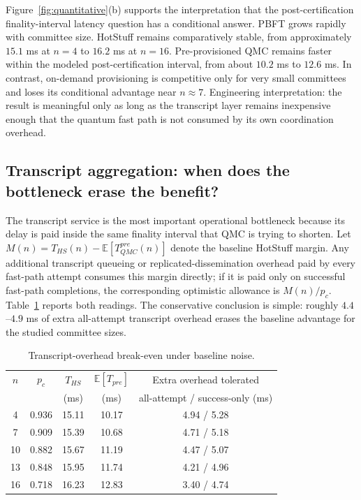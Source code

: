 \documentclass{ieeeaccess}
\begin{document}
Figure~\ref{fig:quantitative}(b) supports the interpretation that the post-certification finality-interval latency question has a conditional answer. PBFT grows rapidly with committee size. HotStuff remains comparatively stable, from approximately $15.1$ ms at $n=4$ to $16.2$ ms at $n=16$. Pre-provisioned QMC remains faster within the modeled post-certification interval, from about $10.2$ ms to $12.6$ ms. In contrast, on-demand provisioning is competitive only for very small committees and loses its conditional advantage near $n\approx 7$. Engineering interpretation: the result is meaningful only as long as the transcript layer remains inexpensive enough that the quantum fast path is not consumed by its own coordination overhead.

\subsection{Transcript aggregation: when does the bottleneck erase the benefit?}
The transcript service is the most important operational bottleneck because its delay is paid inside the same finality interval that QMC is trying to shorten. Let $M(n)=T_{HS}(n)-\mathbb{E}[T_{QMC}^{pre}(n)]$ denote the baseline HotStuff margin. Any additional transcript queueing or replicated-dissemination overhead paid by every fast-path attempt consumes this margin directly; if it is paid only on successful fast-path completions, the corresponding optimistic allowance is $M(n)/p_c$. Table~\ref{tab:aggmargin} reports both readings. The conservative conclusion is simple: roughly $4.4$--$4.9$ ms of extra all-attempt transcript overhead erases the baseline advantage for the studied committee sizes.

\begin{table}[!t]
\caption{Transcript-overhead break-even under baseline noise.}
\label{tab:aggmargin}
\centering
\scriptsize
\setlength{\tabcolsep}{2.4pt}
\renewcommand{\arraystretch}{1.12}
\begin{tabular}{ccccc}
\toprule
$n$ & $p_c$ & $T_{HS}$ & $\mathbb{E}[T_{pre}]$ & Extra overhead tolerated \\
 & & (ms) & (ms) & all-attempt / success-only (ms) \\
\midrule
4  & 0.936 & 15.11 & 10.17 & 4.94 / 5.28 \\
7  & 0.909 & 15.39 & 10.68 & 4.71 / 5.18 \\
10 & 0.882 & 15.67 & 11.19 & 4.47 / 5.07 \\
13 & 0.848 & 15.95 & 11.74 & 4.21 / 4.96 \\
16 & 0.718 & 16.23 & 12.83 & 3.40 / 4.74 \\
\bottomrule
\end{tabular}
\end{table}
\end{document}
